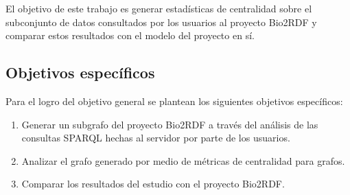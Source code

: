 El objetivo de este trabajo es generar estadísticas de centralidad sobre el
subconjunto de datos consultados por los usuarios al proyecto Bio2RDF y comparar
estos resultados con el modelo del proyecto en sí.

\subsection{Objetivos específicos}
Para el logro del objetivo general se plantean los siguientes objetivos
específicos:
\begin{enumerate}
  \item
    Generar un subgrafo del proyecto Bio2RDF a través del análisis de las
    consultas SPARQL hechas al servidor por parte de los usuarios.
  \item
    Analizar el grafo generado por medio de métricas de centralidad para grafos.
  \item
    Comparar los resultados del estudio con el proyecto Bio2RDF.
\end{enumerate}
